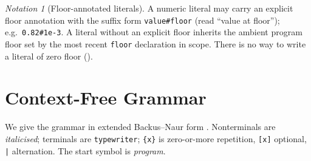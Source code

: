 \documentclass[11pt,a4paper]{article}
\theoremstyle{cfcthm}
\theoremstyle{definition}
\theoremstyle{remark}
\newtheorem{notation}[theorem]{Notation}
\newcommand{\cf}[1]{\texttt{#1}}
\begin{document}
\begin{notation}[Floor-annotated literals]
\label{not:floor-literal}
A numeric literal may carry an explicit floor annotation with the suffix form
\cf{value\#floor} (read ``value at floor''); e.g.\ \cf{0.82\#1e-3}. A literal
without an explicit floor inherits the ambient program floor set by the most
recent \cf{floor} declaration in scope. There is no way to write a literal of
zero floor ().
\end{notation}

\section{Context-Free Grammar}
\label{sec:grammar}

We give the grammar in extended Backus--Naur form
\citep{backus1959,naur1963,aho2006compilers}. Nonterminals are
\textit{italicised}; terminals are \cf{typewriter}; \cf{\{x\}} is zero-or-more
repetition, \cf{[x]} optional, \cf{|} alternation. The start symbol is
\textit{program}.
\end{document}

